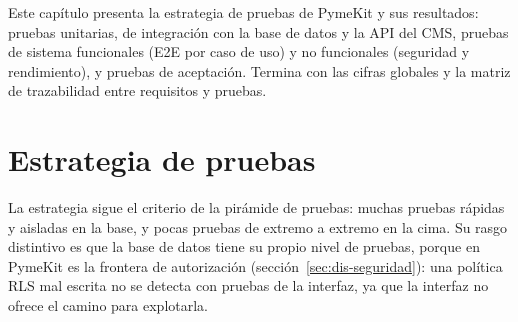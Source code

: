 

Este capítulo presenta la estrategia de pruebas de PymeKit y sus
resultados: pruebas unitarias, de integración con la base de datos y la API
del CMS, pruebas de sistema funcionales (E2E por caso de uso) y no
funcionales (seguridad y rendimiento), y pruebas de aceptación. Termina con
las cifras globales y la matriz de trazabilidad entre requisitos y pruebas.

\section{Estrategia de pruebas}
\label{sec:pru-estrategia}

La estrategia sigue el criterio de la pirámide de pruebas: muchas pruebas
rápidas y aisladas en la base, y pocas pruebas de extremo a extremo en la
cima. Su rasgo distintivo es que la base de datos tiene su propio nivel de
pruebas, porque en PymeKit es la frontera de autorización (sección~\ref{sec:dis-seguridad}):
una política RLS mal escrita no se detecta con pruebas de la interfaz, ya que
la interfaz no ofrece el camino para explotarla.


